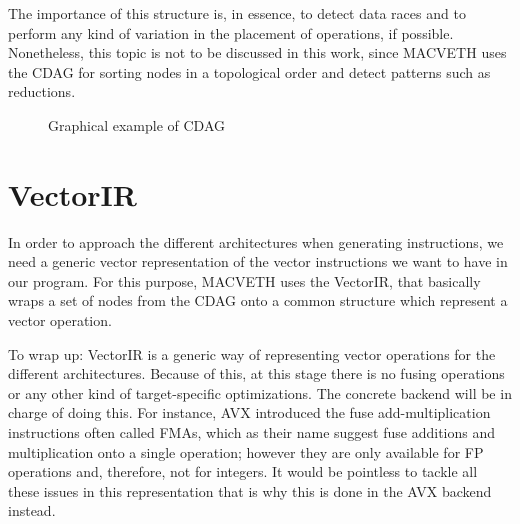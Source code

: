 \documentclass[a4paper,12pt]{memoir}
\begin{document}
The importance of this structure is, in essence, to detect data races and to 
perform any kind of variation in the placement of operations, if possible. 
Nonetheless, this topic is not to be discussed in this work, since MACVETH uses 
the CDAG for sorting nodes in a topological order and detect patterns such as 
reductions.

\begin{figure}[h]
	\centering
{}
\caption{Graphical example of CDAG}
\label{fig:GraphCDAG}
\end{figure}

\section{VectorIR}
In order to approach the different architectures when generating instructions,
we need a generic vector representation of the vector instructions we want to
have in our program. For this purpose, MACVETH uses the VectorIR, that basically
wraps a set of nodes from the CDAG onto a common structure which represent a vector operation.

To wrap up: VectorIR is a generic way of representing vector operations for the different
architectures. Because of this, at this stage there is no fusing operations or
any other kind of target-specific optimizations. The concrete backend will be in
charge of doing this. For instance, AVX introduced the fuse add-multiplication
instructions often called FMAs, which as their name suggest fuse additions and
multiplication onto a single operation; however they are only available for FP
operations and, therefore, not for integers. It would be pointless to tackle
all these issues in this representation that is why this is done in the AVX
backend instead.
\end{document}
